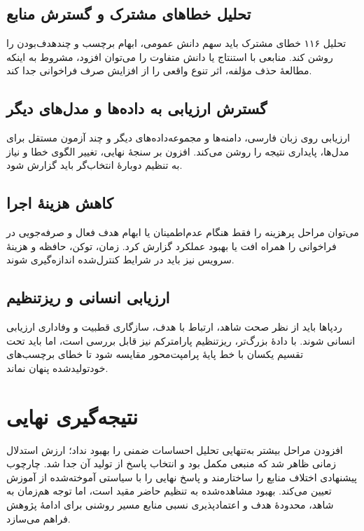 \subsection{تحلیل خطاهای مشترک و گسترش منابع}

تحلیل ۱۱۶ خطای مشترک باید سهم دانش عمومی، ابهام برچسب و چندهدف‌بودن را روشن کند. منابعی با استنتاج یا دانش متفاوت را می‌توان افزود، مشروط به اینکه مطالعۀ حذف مؤلفه، اثر تنوع واقعی را از افزایش صرف فراخوانی جدا کند.

\subsection{گسترش ارزیابی به داده‌ها و مدل‌های دیگر}

ارزیابی روی زبان فارسی، دامنه‌ها و مجموعه‌داده‌های دیگر و چند آزمون مستقل برای مدل‌ها، پایداری نتیجه را روشن می‌کند. افزون بر سنجۀ نهایی، تغییر الگوی خطا و نیاز به تنظیم دوبارۀ انتخاب‌گر باید گزارش شود.

\subsection{کاهش هزینۀ اجرا}

می‌توان مراحل پرهزینه را فقط هنگام عدم‌اطمینان یا ابهام هدف فعال و صرفه‌جویی در فراخوانی را همراه افت یا بهبود عملکرد گزارش کرد. زمان، توکن، حافظه و هزینۀ سرویس نیز باید در شرایط کنترل‌شده اندازه‌گیری شوند.

\subsection{ارزیابی انسانی و ریزتنظیم}

ردپاها باید از نظر صحت شاهد، ارتباط با هدف، سازگاری قطبیت و وفاداری ارزیابی انسانی شوند. با دادۀ بزرگ‌تر، ریزتنظیم پارامترکم نیز قابل بررسی است، اما باید تحت تقسیم یکسان با خط پایۀ پرامپت‌محور مقایسه شود تا خطای برچسب‌های خودتولیدشده پنهان نماند.

\section{نتیجه‌گیری نهایی}

افزودن مراحل بیشتر به‌تنهایی تحلیل احساسات ضمنی را بهبود نداد؛ ارزش استدلال زمانی ظاهر شد که منبعی مکمل بود و انتخاب پاسخ از تولید آن جدا شد. چارچوب پیشنهادی اختلاف منابع را ساختارمند و پاسخ نهایی را با سیاستی آموخته‌شده از آموزش تعیین می‌کند. بهبود مشاهده‌شده به تنظیم حاضر مقید است، اما توجه هم‌زمان به شاهد، محدودۀ هدف و اعتمادپذیری نسبی منابع مسیر روشنی برای ادامۀ پژوهش فراهم می‌سازد.
